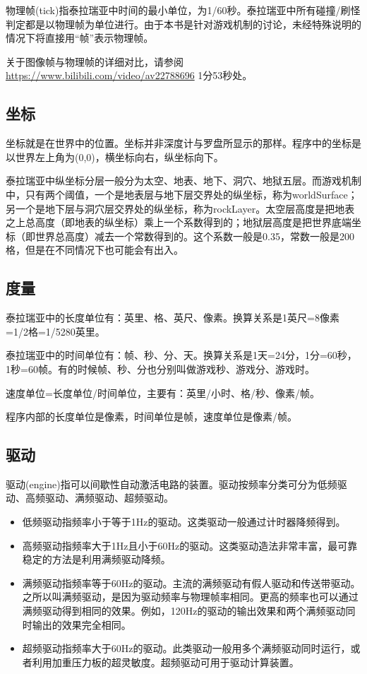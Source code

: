 物理帧(tick)指泰拉瑞亚中时间的最小单位，为1/60秒。泰拉瑞亚中所有碰撞/刷怪判定都是以物理帧为单位进行。由于本书是针对游戏机制的讨论，未经特殊说明的情况下将直接用“帧”表示物理帧。

关于图像帧与物理帧的详细对比，请参阅\url{https://www.bilibili.com/video/av22788696} 1分53秒处。

\subsection{坐标}
坐标就是在世界中的位置。坐标并非深度计与罗盘所显示的那样。程序中的坐标是以世界左上角为(0,0)，横坐标向右，纵坐标向下。

泰拉瑞亚中纵坐标分层一般分为太空、地表、地下、洞穴、地狱五层。而游戏机制中，只有两个阈值，一个是地表层与地下层交界处的纵坐标，称为worldSurface；另一个是地下层与洞穴层交界处的纵坐标，称为rockLayer。太空层高度是把地表之上总高度（即地表的纵坐标）乘上一个系数得到的；地狱层高度是把世界底端坐标（即世界总高度）减去一个常数得到的。这个系数一般是0.35，常数一般是200格，但是在不同情况下也可能会有出入。

\subsection{度量}
泰拉瑞亚中的长度单位有：英里、格、英尺、像素。换算关系是1英尺=8像素=1/2格=1/5280英里。

泰拉瑞亚中的时间单位有：帧、秒、分、天。换算关系是1天=24分，1分=60秒，1秒=60帧。有的时候帧、秒、分也分别叫做游戏秒、游戏分、游戏时。

速度单位=长度单位/时间单位，主要有：英里/小时、格/秒、像素/帧。

程序内部的长度单位是像素，时间单位是帧，速度单位是像素/帧。

\subsection{驱动}

驱动(engine)指可以间歇性自动激活电路的装置。驱动按频率分类可分为低频驱动、高频驱动、满频驱动、超频驱动。

\begin{itemize}
\item 低频驱动指频率小于等于1Hz的驱动。这类驱动一般通过计时器降频得到。
\item 高频驱动指频率大于1Hz且小于60Hz的驱动。这类驱动造法非常丰富，最可靠稳定的方法是利用满频驱动降频。
\item 满频驱动指频率等于60Hz的驱动。主流的满频驱动有假人驱动和传送带驱动。之所以叫满频驱动，是因为驱动频率与物理帧率相同。更高的频率也可以通过满频驱动得到相同的效果。例如，120Hz的驱动的输出效果和两个满频驱动同时输出的效果完全相同。
\item 超频驱动指频率大于60Hz的驱动。此类驱动一般用多个满频驱动同时运行，或者利用加重压力板的超灵敏度。超频驱动可用于驱动计算装置。
\end{itemize}

